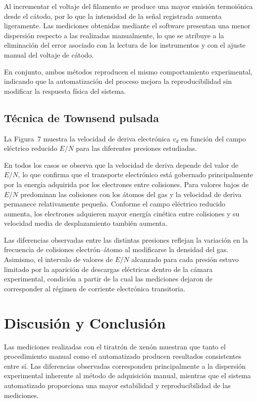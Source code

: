 \documentclass{article}
\begin{document}
Al incrementar el voltaje del filamento se produce una mayor emisión termoiónica desde el cátodo, por lo que la intensidad de la señal registrada aumenta ligeramente. Las mediciones obtenidas mediante el software presentan una menor dispersión respecto a las realizadas manualmente, lo que se atribuye a la eliminación del error asociado con la lectura de los instrumentos y con el ajuste manual del voltaje de cátodo.

En conjunto, ambos métodos reproducen el mismo comportamiento experimental, indicando que la automatización del proceso mejora la reproducibilidad sin modificar la respuesta física del sistema.

\subsection{Técnica de Townsend pulsada}

La Figura~7 muestra la velocidad de deriva electrónica $v_d$ en función del campo eléctrico reducido $E/N$ para las diferentes presiones estudiadas.

En todos los casos se observa que la velocidad de deriva depende del valor de $E/N$, lo que confirma que el transporte electrónico está gobernado principalmente por la energía adquirida por los electrones entre colisiones. Para valores bajos de $E/N$ predominan las colisiones con los átomos del gas y la velocidad de deriva permanece relativamente pequeña. Conforme el campo eléctrico reducido aumenta, los electrones adquieren mayor energía cinética entre colisiones y su velocidad media de desplazamiento también aumenta.

Las diferencias observadas entre las distintas presiones reflejan la variación en la frecuencia de colisiones electrón--átomo al modificarse la densidad del gas. Asimismo, el intervalo de valores de $E/N$ alcanzado para cada presión estuvo limitado por la aparición de descargas eléctricas dentro de la cámara experimental, condición a partir de la cual las mediciones dejaron de corresponder al régimen de corriente electrónica transitoria.



\section{Discusión y Conclusión}

Las mediciones realizadas con el tiratrón de xenón muestran que tanto el procedimiento manual como el automatizado producen resultados consistentes entre sí. Las diferencias observadas corresponden principalmente a la dispersión experimental inherente al método de adquisición manual, mientras que el sistema automatizado proporciona una mayor estabilidad y reproducibilidad de las mediciones.
\end{document}
